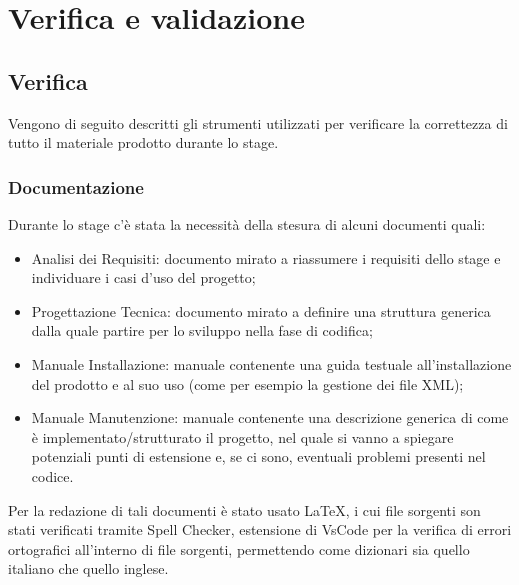 
\chapter{Verifica e validazione}
\label{cap:verifica-validazione}
	\section{Verifica}
		Vengono di seguito descritti gli strumenti utilizzati per verificare la correttezza di tutto il materiale prodotto durante lo stage.
		\subsection{Documentazione}
			Durante lo stage c'è stata la necessità della stesura di alcuni documenti quali:
			\begin{itemize}
				\item Analisi dei Requisiti: documento mirato a riassumere i requisiti dello stage e individuare i casi d'uso del progetto;
				\item Progettazione Tecnica: documento mirato a definire una struttura generica dalla quale partire per lo sviluppo nella fase di codifica;
				\item Manuale Installazione: manuale contenente una guida testuale all'installazione del prodotto e al suo uso (come per esempio la gestione dei file XML);
				\item Manuale Manutenzione: manuale contenente una descrizione generica di come è implementato/strutturato il progetto, nel quale si vanno a spiegare potenziali punti di estensione e, se ci sono, eventuali problemi  presenti nel codice.
			\end{itemize}
			Per la redazione di tali documenti è stato usato \LaTeX, i cui file sorgenti son stati verificati tramite Spell Checker, estensione di VsCode per la verifica di errori ortografici all'interno di file sorgenti, permettendo come dizionari sia quello italiano che quello inglese.\\
			
